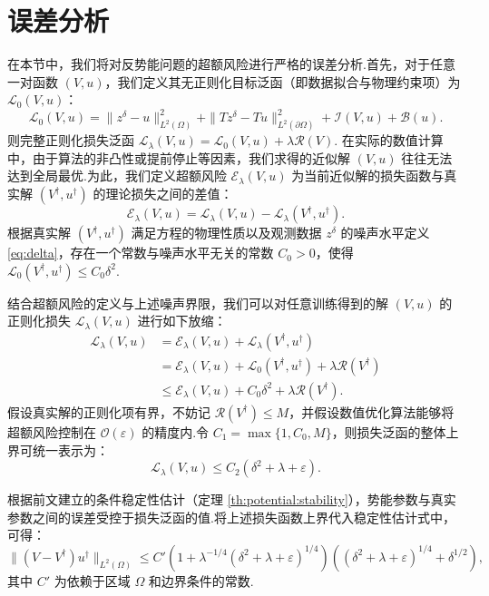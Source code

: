 \section{误差分析}\label{sec:error:excessrisk}
在本节中，我们将对反势能问题的超额风险进行严格的误差分析.首先，对于任意一对函数 $(V,u)$，我们定义其无正则化目标泛函（即数据拟合与物理约束项）为 $\mathcal{L}_0(V,u)$：
\begin{equation*}
\mathcal{L}_0(V,u)=\|z^{\delta}-u\|_{L^{2}(\Omega)}^{2}+\|Tz^{\delta}-Tu\|_{L^{2}(\partial\Omega)}^{2}+\mathcal{I}(V,u)+\mathcal{B}(u).
\end{equation*}
则完整正则化损失泛函 $\mathcal{L}_{\lambda}(V,u) = \mathcal{L}_0(V,u) + \lambda \mathcal{R}(V)$.
在实际的数值计算中，由于算法的非凸性或提前停止等因素，我们求得的近似解 $(V,u)$ 往往无法达到全局最优.为此，我们定义超额风险 $\mathcal{E}_{\lambda}(V,u)$ 为当前近似解的损失函数与真实解 $(V^{\dagger},u^{\dagger})$ 的理论损失之间的差值：
$$\mathcal{E}_{\lambda}(V,u)=\mathcal{L}_{\lambda}(V,u)-\mathcal{L}_{\lambda}(V^{\dagger},u^{\dagger}).$$
根据真实解 $(V^{\dagger},u^{\dagger})$ 满足方程的物理性质以及观测数据 $z^\delta$ 的噪声水平定义 \eqref{eq:delta}，存在一个常数与噪声水平无关的常数 $C_0 > 0$，使得$\mathcal{L}_0(V^{\dagger},u^{\dagger})\leq C_0 \delta^{2}.$

结合超额风险的定义与上述噪声界限，我们可以对任意训练得到的解 $(V,u)$ 的正则化损失 $\mathcal{L}_{\lambda}(V,u)$ 进行如下放缩：
$$\begin{aligned} 
\mathcal{L}_{\lambda}(V,u) &= \mathcal{E}_{\lambda}(V,u) + \mathcal{L}_{\lambda}(V^{\dagger},u^{\dagger}) \\
&= \mathcal{E}_{\lambda}(V,u) + \mathcal{L}_0(V^{\dagger},u^{\dagger}) + \lambda \mathcal{R}(V^{\dagger}) \\
&\leq \mathcal{E}_{\lambda}(V,u) + C_0 \delta^{2} + \lambda \mathcal{R}(V^{\dagger}). 
\end{aligned}$$
假设真实解的正则化项有界，不妨记 $\mathcal{R}(V^{\dagger}) \leq M$，并假设数值优化算法能够将超额风险控制在 $\mathcal{O}(\varepsilon)$ 的精度内.令 $C_1 = \max\{1, C_0, M\}$，则损失泛函的整体上界可统一表示为：
$$\mathcal{L}_{\lambda}(V,u) \leq C_2 (\delta^2 + \lambda + \varepsilon).$$

根据前文建立的条件稳定性估计（定理 \ref{th:potential:stability}），势能参数与真实参数之间的误差受控于损失泛函的值.将上述损失函数上界代入稳定性估计式中，可得：
$$\|(V-V^{\dagger})u^{\dagger}\|_{L^{2}(\Omega)} \leq C'\left(1+\lambda^{-1/4}(\delta^2+\lambda+\varepsilon)^{1/4}\right)\left((\delta^2+\lambda+\varepsilon)^{1/4}+\delta^{1/2}\right),$$
其中 $C'$ 为依赖于区域 $\Omega$ 和边界条件的常数.

